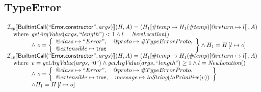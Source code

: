 \subsection{TypeError}
\[
\begin{array}{l}
\mathcal{I} _{cp}\llbracket \mbox{\textsf{BuiltintCall}}(``\mbox{\textsf{Error.constructor}}",args)\rrbracket(H,A)
  = (H_1[\#temp \mapsto H_1(\#temp)[@return \mapsto l]], A)\\
\quad{\rm where}\begin{array}[t]{l}
  \emph{getArgValue}(args, ``length") < 1 
  \land l=\emph{NewLocation}()\\
  \land\ o = \left\{\begin{array}{l}
    @class\mapsto ``Error", \quad
    @proto\mapsto \#TypeErrorProto,\\
    @extensible\mapsto \mbox{\textsf{true}}
    \end{array}\right\}
  \land H_1=H\left[l\mapsto o\right]\\
  \end{array}\\
  
\mathcal{I} _{cp}\llbracket \mbox{\textsf{BuiltintCall}}(``\mbox{\textsf{Error.constructor}}",args)\rrbracket(H,A)
  = (H_1[\#temp \mapsto H_1(\#temp)[@return \mapsto l]], A)\\
\quad{\rm where}\begin{array}[t]{l}
  v = \emph{getArgValue}(args, ``0") \land \emph{getArgValue}(args, ``length") \geq 1
  \land l=\emph{NewLocation}()\\
  \land\ o = \left\{\begin{array}{l}
    @class\mapsto ``Error", \quad
    @proto\mapsto \#TypeErrorProto,\\
    @extensible\mapsto \mbox{\textsf{true}},  \quad
    message \mapsto \emph{toString}(\emph{toPrimitive}(v)) 
    \end{array}\right\}\\
  \land H_1=H\left[l\mapsto o\right]
  \end{array}\\

\end{array}
\]


